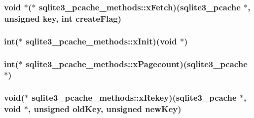 \hypertarget{structsqlite3__pcache__methods_a2e054ad70c9672b504d3d7291e4eb487}{
\subsubsection[{x\-Fetch}]{\setlength{\rightskip}{0pt plus 5cm}void $\ast$($\ast$ sqlite3\-\_\-pcache\-\_\-methods\-::x\-Fetch)({\bf sqlite3\-\_\-pcache} $\ast$, unsigned key, int create\-Flag)}}\label{structsqlite3__pcache__methods_a2e054ad70c9672b504d3d7291e4eb487}
\hypertarget{structsqlite3__pcache__methods_ab5f54101f6060de1af0c87b2456231ad}{
\subsubsection[{x\-Init}]{\setlength{\rightskip}{0pt plus 5cm}int($\ast$ sqlite3\-\_\-pcache\-\_\-methods\-::x\-Init)(void $\ast$)}}\label{structsqlite3__pcache__methods_ab5f54101f6060de1af0c87b2456231ad}
\hypertarget{structsqlite3__pcache__methods_a0ab192dc811798e8f17c445dbf379989}{
\subsubsection[{x\-Pagecount}]{\setlength{\rightskip}{0pt plus 5cm}int($\ast$ sqlite3\-\_\-pcache\-\_\-methods\-::x\-Pagecount)({\bf sqlite3\-\_\-pcache} $\ast$)}}\label{structsqlite3__pcache__methods_a0ab192dc811798e8f17c445dbf379989}
\hypertarget{structsqlite3__pcache__methods_adc5552190f1de86eb95d91e9cf8430e6}{
\subsubsection[{x\-Rekey}]{\setlength{\rightskip}{0pt plus 5cm}void($\ast$ sqlite3\-\_\-pcache\-\_\-methods\-::x\-Rekey)({\bf sqlite3\-\_\-pcache} $\ast$, void $\ast$, unsigned old\-Key, unsigned new\-Key)}}\label{structsqlite3__pcache__methods_adc5552190f1de86eb95d91e9cf8430e6}
